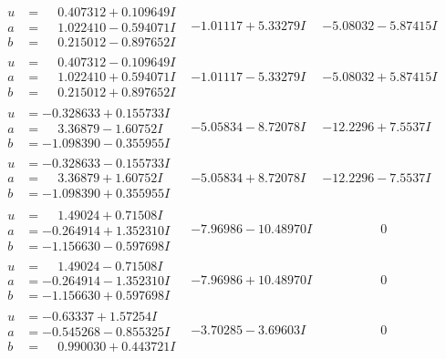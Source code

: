 \documentclass[1p]{elsarticle_modified}
\theoremstyle{definition}
\begin{document}
$$\begin{array}{c|c|c}
\begin{aligned}
u &= \phantom{-}0.407312 + 0.109649 I \\
a &= \phantom{-}1.022410 - 0.594071 I \\
b &= \phantom{-}0.215012 - 0.897652 I\end{aligned}
 & -1.01117 + 5.33279 I & -5.08032 - 5.87415 I \\ \hline\begin{aligned}
u &= \phantom{-}0.407312 - 0.109649 I \\
a &= \phantom{-}1.022410 + 0.594071 I \\
b &= \phantom{-}0.215012 + 0.897652 I\end{aligned}
 & -1.01117 - 5.33279 I & -5.08032 + 5.87415 I \\ \hline\begin{aligned}
u &= -0.328633 + 0.155733 I \\
a &= \phantom{-}3.36879 - 1.60752 I \\
b &= -1.098390 - 0.355955 I\end{aligned}
 & -5.05834 - 8.72078 I & -12.2296 + 7.5537 I \\ \hline\begin{aligned}
u &= -0.328633 - 0.155733 I \\
a &= \phantom{-}3.36879 + 1.60752 I \\
b &= -1.098390 + 0.355955 I\end{aligned}
 & -5.05834 + 8.72078 I & -12.2296 - 7.5537 I \\ \hline\begin{aligned}
u &= \phantom{-}1.49024 + 0.71508 I \\
a &= -0.264914 + 1.352310 I \\
b &= -1.156630 - 0.597698 I\end{aligned}
 & -7.96986 - 10.48970 I & \phantom{-0.000000 } 0 \\ \hline\begin{aligned}
u &= \phantom{-}1.49024 - 0.71508 I \\
a &= -0.264914 - 1.352310 I \\
b &= -1.156630 + 0.597698 I\end{aligned}
 & -7.96986 + 10.48970 I & \phantom{-0.000000 } 0 \\ \hline\begin{aligned}
u &= -0.63337 + 1.57254 I \\
a &= -0.545268 - 0.855325 I \\
b &= \phantom{-}0.990030 + 0.443721 I\end{aligned}
 & -3.70285 - 3.69603 I & \phantom{-0.000000 } 0 \\ \hline\begin{aligned}

\end{aligned}
\end{array}$$
\end{document}

